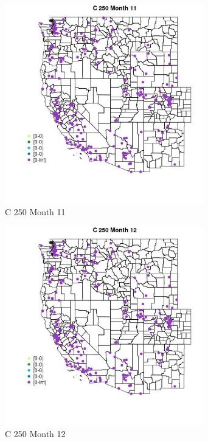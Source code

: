 \begin{figure} 
\centering  
\includegraphics[width=0.77\textwidth]{Code_Outputs/Report_ML_input_PM25_Step4_part_e_de_duplicated_aveswNAs_MapObsMo11C_250.jpg} 
\caption{\label{fig:Report_ML_input_PM25_Step4_part_e_de_duplicated_aveswNAsMapObsMo11C_250}C 250 Month 11} 
\end{figure} 
 

\begin{figure} 
\centering  
\includegraphics[width=0.77\textwidth]{Code_Outputs/Report_ML_input_PM25_Step4_part_e_de_duplicated_aveswNAs_MapObsMo12C_250.jpg} 
\caption{\label{fig:Report_ML_input_PM25_Step4_part_e_de_duplicated_aveswNAsMapObsMo12C_250}C 250 Month 12} 
\end{figure} 
 

